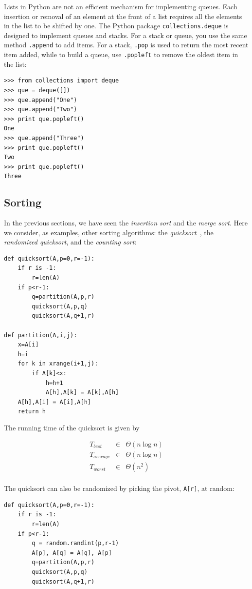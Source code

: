 \documentclass[justified,sixbynine]{tufte-book}
\def\ft{\small\tt}
\theoremstyle{plain}%
\theoremstyle{definition}
\theoremstyle{remark}
\begin{document}
\begin{fullwidth}
Lists in Python are not an efficient mechanism for implementing queues.  Each insertion or removal of an element at the front of a list requires all the elements in the list to be shifted by one. The Python package {\ft collections.deque} is designed to implement queues and stacks.  For a stack or queue, you use the same method {\ft .append} to add items.  For a stack, {\ft .pop} is used to return the most recent item added, while to build a queue, use {\ft .popleft} to remove the oldest item in the list:

\begin{lstlisting}
>>> from collections import deque
>>> que = deque([])
>>> que.append("One")
>>> que.append("Two")
>>> print que.popleft()
One
>>> que.append("Three")
>>> print que.popleft()
Two
>>> print que.popleft()
Three
\end{lstlisting}


\goodbreak\subsection{Sorting}


In the previous sections, we have seen the {\it insertion sort} and the {\it merge sort}. Here we consider, as examples, other sorting algorithms: the {\it quicksort}~\cite{mergesort}, the {\it randomized quicksort}, and the {\it counting sort}:

\begin{lstlisting}
def quicksort(A,p=0,r=-1):
    if r is -1:
        r=len(A)
    if p<r-1:
        q=partition(A,p,r)
        quicksort(A,p,q)
        quicksort(A,q+1,r)

def partition(A,i,j):
    x=A[i]
    h=i
    for k in xrange(i+1,j):
        if A[k]<x:
            h=h+1
            A[h],A[k] = A[k],A[h]
    A[h],A[i] = A[i],A[h]
    return h
\end{lstlisting}

The running time of the quicksort is given by

\begin{eqnarray}
T_{best} &\in &\Theta (n\log n) \\
T_{average} &\in &\Theta (n\log n) \\
T_{worst} &\in &\Theta (n^2) \\
\end{eqnarray}

The quicksort can also be randomized by picking the pivot, {\ft A[r]}, at random:
\begin{lstlisting}
def quicksort(A,p=0,r=-1):
    if r is -1:
        r=len(A)
    if p<r-1:
        q = random.randint(p,r-1)
        A[p], A[q] = A[q], A[p]
        q=partition(A,p,r)
        quicksort(A,p,q)
        quicksort(A,q+1,r)
\end{lstlisting}


\end{fullwidth}
\end{document}
